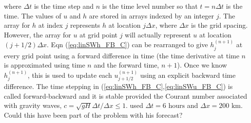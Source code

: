 where $\Delta t$ is the time step and $n$ is the time level number
so that $t=n\Delta t$ is the time. The values of $u$ and $h$ are
stored in arrays indexed by an integer $j$. The array for $h$ at
index $j$ represents $h$ at location $j\Delta x$, where $\Delta x$
is the grid spacing. However, the array for $u$ at grid point $j$
will actually represent $u$ at location $\left(j+1/2\right)\Delta x$.
Eqn (\ref{eq:linSWh_FB_C}) can be rearranged to give $h_{j}^{(n+1)}$
at every grid point using a forward difference in time (the time derivative
at time $n$ is approximated using time $n$ and the forward time,
$n+1$). Once we know $h_{j}^{(n+1)}$, this is used to update each
$u_{j+1/2}^{(n+1)}$ using an explicit backward time difference. The
time stepping in (\ref{eq:linSWh_FB_C},\ref{eq:linSWu_FB_C}) is
called forward-backward \citep{Mes77} and it is stable provided the
Courant number associated with gravity waves, $c=\sqrt{gH}\Delta t/\Delta x\le1$.
\citet{Rich22} used $\Delta t=6\text{ hours}$ and $\Delta x=200\text{ km}$.
Could this have been part of the problem with his forecast?

